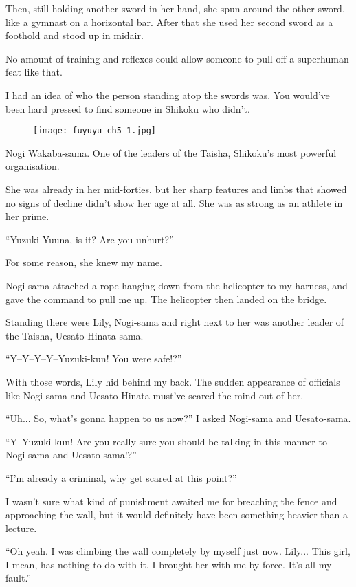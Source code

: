 Then, still holding another sword in her hand, she spun around the other sword, like a gymnast on a horizontal bar. After that she used her second sword as a foothold and stood up in midair.

No amount of training and reflexes could allow someone to pull off a superhuman feat like that.

I had an idea of who the person standing atop the swords was. You would've been hard pressed to find someone in Shikoku who didn't.

\begin{figure}[p]
\texttt{[image: fuyuyu-ch5-1.jpg]}
\end{figure}

Nogi Wakaba-sama. One of the leaders of the Taisha, Shikoku's most powerful organisation.

She was already in her mid-forties, but her sharp features and limbs that showed no signs of decline didn't show her age at all. She was as strong as an athlete in her prime.

``Yuzuki Yuuna, is it? Are you unhurt?''

For some reason, she knew my name.

Nogi-sama attached a rope hanging down from the helicopter to my harness, and gave the command to pull me up. The helicopter then landed on the bridge.

Standing there were Lily, Nogi-sama and right next to her was another leader of the Taisha, Uesato Hinata-sama.

``Y--Y--Y--Y--Yuzuki-kun! You were safe!?''

With those words, Lily hid behind my back. The sudden appearance of officials like Nogi-sama and Uesato Hinata must've scared the mind out of her.

``Uh... So, what's gonna happen to us now?'' I asked Nogi-sama and Uesato-sama.

``Y--Yuzuki-kun! Are you really sure you should be talking in this manner to Nogi-sama and Uesato-sama!?''

``I'm already a criminal, why get scared at this point?''

I wasn't sure what kind of punishment awaited me for breaching the fence and approaching the wall, but it would definitely have been something heavier than a lecture.

``Oh yeah. I was climbing the wall completely by myself just now. Lily... This girl, I mean, has nothing to do with it. I brought her with me by force. It's all my fault.''

